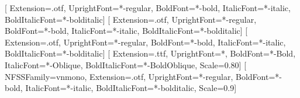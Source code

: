 \usepackage[a4paper,top=2.2cm,bottom=2.2cm,left=2.1cm,right=2.1cm,headheight=15pt]{geometry}

\usepackage{fontspec}
\setmainfont{texgyreheros}[
  Extension=.otf, UprightFont=*-regular, BoldFont=*-bold,
  ItalicFont=*-italic, BoldItalicFont=*-bolditalic]
\setsansfont{texgyreheros}[
  Extension=.otf, UprightFont=*-regular, BoldFont=*-bold,
  ItalicFont=*-italic, BoldItalicFont=*-bolditalic]
\newfontfamily{}[
  Extension=.otf, UprightFont=*-regular, BoldFont=*-bold,
  ItalicFont=*-italic, BoldItalicFont=*-bolditalic]
\setmonofont{DejaVuSansMono}[
  Extension=.ttf, UprightFont=*, BoldFont=*-Bold,
  ItalicFont=*-Oblique, BoldItalicFont=*-BoldOblique, Scale=0.80]
\newfontfamily{}[
  NFSSFamily=vnmono, Extension=.otf, UprightFont=*-regular, BoldFont=*-bold,
  ItalicFont=*-italic, BoldItalicFont=*-bolditalic, Scale=0.9]

\usepackage{babel}
\AtBeginDocument{%
  \renewcommand{\contentsname}{Mục lục}%
  \renewcommand{\listtablename}{Danh mục bảng}%
  \renewcommand{\listfigurename}{Danh mục hình}%
  \renewcommand{\tablename}{Bảng}%
  \renewcommand{\figurename}{Hình}}

\usepackage{amsmath,amssymb}
\usepackage{newunicodechar}


